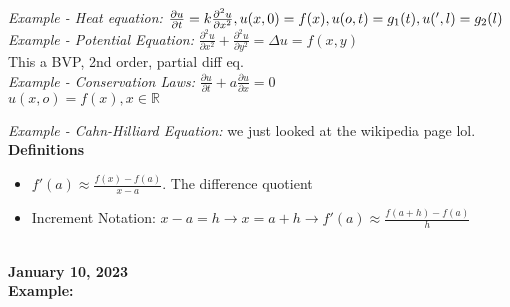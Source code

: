 \documentclass[10pt, AMS Euler]{article}
\newcommand{\R}{\mathbb{R}}
\begin{document}
\textit{Example - Heat equation:} $\frac{\partial u}{\partial t} = k \frac{\partial^2 u}{\partial x^2},\\ u(x,0) = f(x), u(o, t) = g_1(t), u(', l) = g_2(l)$\\

\textit{Example - Potential Equation:} $\frac{\partial^2 u}{\partial x^2} + \frac{\partial^2 u}{\partial y^2} = \Delta u = f(x, y)$\\
This a BVP, 2nd order, partial diff eq.\\

\textit{Example - Conservation Laws:} $\frac{\partial u}{\partial t} + a \frac{\partial u}{\partial x} = 0$\\
$u(x, o) = f(x), x \in \R$

\textit{Example - Cahn-Hilliard Equation:} we just looked at the wikipedia page lol.\\

\textbf{Definitions}\\
\begin{itemize}
    \item $f'(a) \approx \frac{f(x) - f(a)}{x - a}$. The difference quotient
    \item Increment Notation: $x - a = h \rightarrow x = a + h \rightarrow f'(a) \approx \frac{f(a + h) - f(a)}{h}$
\end{itemize}

\noindent \underline{\hspace{3in}}\\

\textbf{January 10, 2023}\\

\textbf{Example:}

\noindent \underline{\hspace{3in}}\\
\end{document}

